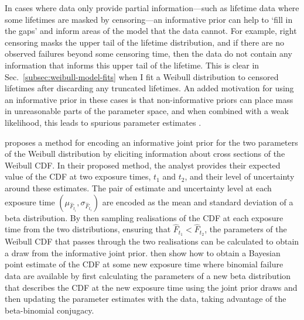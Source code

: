 In cases where data only provide partial information---such as lifetime data where some lifetimes are masked by censoring---an informative prior can help to `fill in the gaps' and inform areas of the model that the data cannot. For example, right censoring masks the upper tail of the lifetime distribution, and if there are no observed failures beyond some censoring time, then the data do not contain any information that informs this upper tail of the lifetime. This is clear in Sec.~\ref{subsec:weibull-model-fits} when I fit a Weibull distribution to censored lifetimes after discarding any truncated lifetimes. An added motivation for using an informative prior in these cases is that non-informative priors can place mass in unreasonable parts of the parameter space, and when combined with a weak likelihood, this leads to spurious parameter estimates \citep{tian2024}.

\citet{kaminskiy2005} proposes a method for encoding an informative joint prior for the two parameters of the Weibull distribution by eliciting information about cross sections of the Weibull CDF. In their proposed method, the analyst provides their expected value of the CDF at two exposure times, $t_1$ and $t_2$, and their level of uncertainty around these estimates. The pair of estimate and uncertainty level at each exposure time $(\mu_{\hat{F}_{t_i}}, \sigma_{\hat{F}_{t_i}})$ are encoded as the mean and standard deviation of a beta distribution. By then sampling realisations of the CDF at each exposure time from the two distributions, ensuring that $\hat{F}_{t_1} < \hat{F}_{t_2}$, the parameters of the Weibull CDF that passes through the two realisations can be calculated to obtain a draw from the informative joint prior. \citeauthor{kaminskiy2005} then show how to obtain a Bayesian point estimate of the CDF at some new exposure time where binomial failure data are available by first calculating the parameters of a new beta distribution that describes the CDF at the new exposure time using the joint prior draws and then updating the parameter estimates with the data, taking advantage of the beta-binomial conjugacy.

